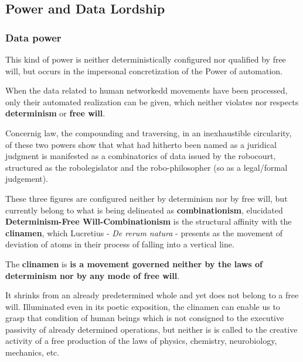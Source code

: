 
\subsection{Power and Data Lordship}

\subsubsection{Data power}

This kind of power is neither deterministically configured nor qualified by free will,
but occurs in the impersonal concretization of the Power of automation. 

When the data related to human networkedd movements have been processed, only their 
automated realization can be given, which neither violates nor respects \textbf{determinism}
or \textbf{free will}. 

Concernig law, the compounding and traversing, in an inexhaustible circularity, of these two
powers show that what had hitherto been named as a juridical
judgment is manifested as a combinatorics of data issued by the robocourt, structured as the 
robolegislator and the robo-philosopher (so as a legal/formal judgement).
\begin{note}
    These three figures are configured neither by determinism nor by free will, but currently belong
    to what is being delineated as \textbf{combinationism}, elucidated \textbf{Determinism-Free 
    Will-Combinationism} is the structural affinity with the \textbf{clinamen}, which Lucretius - \textit{De rerum natura} -
    presents as the movement of deviation of atoms in their process of falling into a vertical line.
\end{note}

\begin{definition}
    The \textbf{clinamen} is \textbf{is a movement governed neither by the laws of determinism nor by any mode of free will}.

    It shrinks from an already predetermined whole and yet does not belong to a free will. Illuminated
    even in its poetic exposition, the clinamen can enable us to grasp that condition of human beings 
    which is not consigned to the executive passivity of already determined operations, but neither is
    is called to the creative activity of a free production of the laws of physics, chemistry, neurobiology,
    mechanics, etc.
\end{definition}

